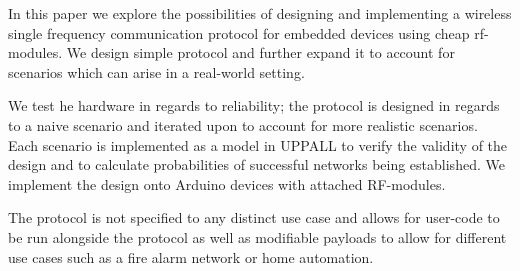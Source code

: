In this paper we explore the possibilities of designing and implementing a wireless single frequency communication protocol for embedded devices using cheap \acrshort{rf}-modules.
We design simple protocol and further expand it to account for scenarios which can arise in a real-world setting.

\medskip
We test he hardware in regards to reliability; the protocol is designed in regards to a naive scenario and iterated upon to account for more realistic scenarios.
Each scenario is implemented as a model in UPPALL to verify the validity of the design and to calculate probabilities of successful networks being established.
We implement the design onto Arduino devices with attached RF-modules.

\medskip
The protocol is not specified to any distinct use case and allows for user-code to be run alongside the protocol as well as modifiable payloads to allow for different use cases such as a fire alarm network or home automation. 